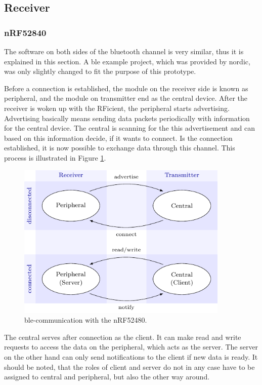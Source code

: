 \subsection{Receiver}

\subsubsection{nRF52840}
The software on both sides of the bluetooth channel is very similar, thus it is explained in this section.
A \acs{ble} example project, which was provided by nordic, was only slightly changed to fit the purpose of this prototype.

Before a connection is established, the module on the receiver side is known as peripheral, and the module on transmitter end as the central device.
After the receiver is woken up with the RFicient, the peripheral starts advertising.
Advertising basically means sending data packets periodically with information for the central device.
The central is scanning for the this advertisement and can based on this information decide, if it wants to connect.
Is the connection established, it is now possible to exchange data through this channel.
This process is illustrated in Figure \ref{software:ble}.
\begin{figure}[ht]
	\centering
	\includegraphics[width=0.9\textwidth]{4-development/software/graphics/ble.pdf}
	\caption{\acs{ble}-communication with the nRF52480.\label{software:ble}}
\end{figure}

The central serves after connection as the client.
It can make read and write requests to access the data on the peripheral, which acts as the server.
The server on the other hand can only send notifications to the client if new data is ready.
It should be noted, that the roles of client and server do not in any case have to be assigned to central and peripheral, but also the other way around. 

